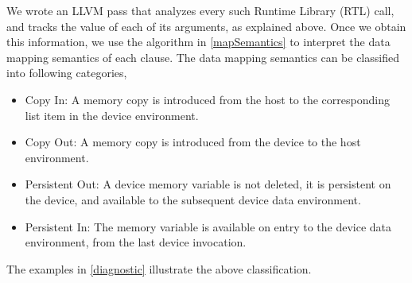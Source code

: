 We wrote an LLVM pass that analyzes every such Runtime Library (RTL) call, and tracks the 
value of each of its arguments, as explained above. Once we obtain this information, 
we use the algorithm in \autoref{mapSemantics} to interpret the data mapping semantics of each clause.
The data mapping semantics can be classified into following categories, 
\begin{itemize} 
\vspace{-5pt}
 \item Copy In: A memory copy is introduced from the host to the 
 corresponding list item in the device environment.
 \item Copy Out: A memory copy is introduced from the device to the host environment.
 \item Persistent Out: A device memory variable is not deleted, it is persistent on the device, 
 and available to the subsequent device data environment.
 \item Persistent In: The memory variable is available on entry to the device data environment, 
 from the last device invocation.
\end{itemize}
The examples in \autoref{diagnostic} illustrate the above classification.

